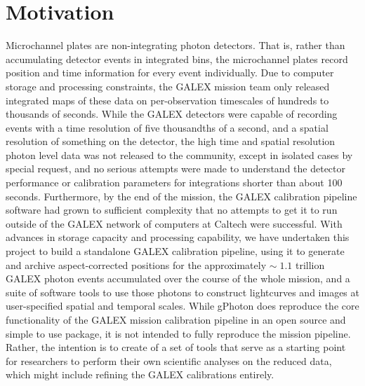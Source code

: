 \documentclass[preprint]{aastex}
\begin{document}
\section{Motivation}
\label{motivation}
Microchannel plates are non-integrating photon detectors. That is, rather than accumulating detector events in integrated bins, the microchannel plates record position and time information for every event individually. Due to computer storage and processing constraints, the GALEX mission team only released integrated maps of these data on per-observation timescales of hundreds to thousands of seconds. While the GALEX detectors were capable of recording events with a time resolution of five thousandths of a second, and a spatial resolution of {\color{red}something} on the detector, the high time and spatial resolution photon level data was not released to the community, except in isolated cases by special request, and no serious attempts were made to understand the detector performance or calibration parameters for integrations shorter than about 100 seconds. Furthermore, by the end of the mission, the GALEX calibration pipeline software had grown to sufficient complexity that no attempts to get it to run outside of the GALEX network of computers at Caltech were successful. With advances in storage capacity and processing capability, we have undertaken this project to build a standalone GALEX calibration pipeline, using it to generate and archive aspect-corrected positions for the approximately $\sim\;1.1$ trillion GALEX photon events accumulated over the course of the whole mission, and a suite of software tools to use those photons to construct lightcurves and images at user-specified spatial and temporal scales.  While gPhoton does reproduce the core functionality of the GALEX mission calibration pipeline in an open source and simple to use package, it is not intended to fully reproduce the mission pipeline. Rather, the intention is to create of a set of tools that serve as a starting point for researchers to perform their own scientific analyses on the reduced data, which might include refining the GALEX calibrations entirely.
\end{document}
